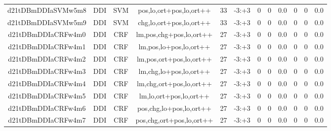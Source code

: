 \documentclass[a4paper]{article}
\begin{document}
\begin{landscape}
\begin{center}
\begin{tabular}{ |c|c|c|c|c|c|c|c|c|c|c|c|}
 
 	
 	\small{ d21tDBmDDIaSVMw5m8 } & \small{ DDI} & \small{  SVM }  & pos,lo,ort+pos,lo,ort++  &  33 &  \small{  -3:+3 }  &  0 & 0 & 0.0  &  0 & 0 & 0.0 \\
 	

 
 	
 	\small{ d21tDBmDDIaSVMw5m9 } & \small{ DDI} & \small{  SVM }  & chg,lo,ort+pos,lo,ort++  &  33 &  \small{  -3:+3 }  &  0 & 0 & 0.0  &  0 & 0 & 0.0 \\
 	

 
 	
 	\small{ d21tDBmDDIaCRFw4m0 } & \small{ DDI} & \small{  CRF }  & lm,pos,chg+pos,lo,ort++  &  27 &  \small{  -3:+3 }  &  0 & 0 & 0.0  &  0 & 0 & 0.0 \\
 	

 
 	
 	\small{ d21tDBmDDIaCRFw4m1 } & \small{ DDI} & \small{  CRF }  & lm,pos,lo+pos,lo,ort++  &  27 &  \small{  -3:+3 }  &  0 & 0 & 0.0  &  0 & 0 & 0.0 \\
 	

 
 	
 	\small{ d21tDBmDDIaCRFw4m2 } & \small{ DDI} & \small{  CRF }  & lm,pos,ort+pos,lo,ort++  &  27 &  \small{  -3:+3 }  &  0 & 0 & 0.0  &  0 & 0 & 0.0 \\
 	

 
 	
 	\small{ d21tDBmDDIaCRFw4m3 } & \small{ DDI} & \small{  CRF }  & lm,chg,lo+pos,lo,ort++  &  27 &  \small{  -3:+3 }  &  0 & 0 & 0.0  &  0 & 0 & 0.0 \\
 	

 
 	
 	\small{ d21tDBmDDIaCRFw4m4 } & \small{ DDI} & \small{  CRF }  & lm,chg,ort+pos,lo,ort++  &  27 &  \small{  -3:+3 }  &  0 & 0 & 0.0  &  0 & 0 & 0.0 \\
 	

 
 	
 	\small{ d21tDBmDDIaCRFw4m5 } & \small{ DDI} & \small{  CRF }  & lm,lo,ort+pos,lo,ort++  &  27 &  \small{  -3:+3 }  &  0 & 0 & 0.0  &  0 & 0 & 0.0 \\
 	

 
 	
 	\small{ d21tDBmDDIaCRFw4m6 } & \small{ DDI} & \small{  CRF }  & pos,chg,lo+pos,lo,ort++  &  27 &  \small{  -3:+3 }  &  0 & 0 & 0.0  &  0 & 0 & 0.0 \\
 	

 
 	
 	\small{ d21tDBmDDIaCRFw4m7 } & \small{ DDI} & \small{  CRF }  & pos,chg,ort+pos,lo,ort++  &  27 &  \small{  -3:+3 }  &  0 & 0 & 0.0  &  0 & 0 & 0.0 \\
 	


\end{tabular}
\end{center}
\end{landscape}
\end{document}
